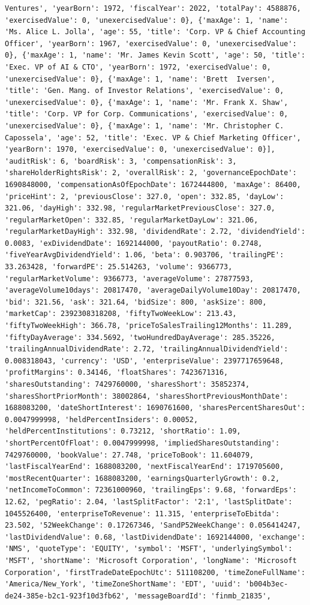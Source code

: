 \documentclass[
  letterpaper,
]{report}
\begin{document}
\begin{verbatim}
Ventures', 'yearBorn': 1972, 'fiscalYear': 2022, 'totalPay': 4588876, 'exercisedValue': 0, 'unexercisedValue': 0}, {'maxAge': 1, 'name': 'Ms. Alice L. Jolla', 'age': 55, 'title': 'Corp. VP & Chief Accounting Officer', 'yearBorn': 1967, 'exercisedValue': 0, 'unexercisedValue': 0}, {'maxAge': 1, 'name': 'Mr. James Kevin Scott', 'age': 50, 'title': 'Exec. VP of AI & CTO', 'yearBorn': 1972, 'exercisedValue': 0, 'unexercisedValue': 0}, {'maxAge': 1, 'name': 'Brett  Iversen', 'title': 'Gen. Mang. of Investor Relations', 'exercisedValue': 0, 'unexercisedValue': 0}, {'maxAge': 1, 'name': 'Mr. Frank X. Shaw', 'title': 'Corp. VP for Corp. Communications', 'exercisedValue': 0, 'unexercisedValue': 0}, {'maxAge': 1, 'name': 'Mr. Christopher C. Capossela', 'age': 52, 'title': 'Exec. VP & Chief Marketing Officer', 'yearBorn': 1970, 'exercisedValue': 0, 'unexercisedValue': 0}], 'auditRisk': 6, 'boardRisk': 3, 'compensationRisk': 3, 'shareHolderRightsRisk': 2, 'overallRisk': 2, 'governanceEpochDate': 1690848000, 'compensationAsOfEpochDate': 1672444800, 'maxAge': 86400, 'priceHint': 2, 'previousClose': 327.0, 'open': 332.85, 'dayLow': 321.06, 'dayHigh': 332.98, 'regularMarketPreviousClose': 327.0, 'regularMarketOpen': 332.85, 'regularMarketDayLow': 321.06, 'regularMarketDayHigh': 332.98, 'dividendRate': 2.72, 'dividendYield': 0.0083, 'exDividendDate': 1692144000, 'payoutRatio': 0.2748, 'fiveYearAvgDividendYield': 1.06, 'beta': 0.903706, 'trailingPE': 33.263428, 'forwardPE': 25.514263, 'volume': 9366773, 'regularMarketVolume': 9366773, 'averageVolume': 27877593, 'averageVolume10days': 20817470, 'averageDailyVolume10Day': 20817470, 'bid': 321.56, 'ask': 321.64, 'bidSize': 800, 'askSize': 800, 'marketCap': 2392308318208, 'fiftyTwoWeekLow': 213.43, 'fiftyTwoWeekHigh': 366.78, 'priceToSalesTrailing12Months': 11.289, 'fiftyDayAverage': 334.5692, 'twoHundredDayAverage': 285.35226, 'trailingAnnualDividendRate': 2.72, 'trailingAnnualDividendYield': 0.008318043, 'currency': 'USD', 'enterpriseValue': 2397717659648, 'profitMargins': 0.34146, 'floatShares': 7423671316, 'sharesOutstanding': 7429760000, 'sharesShort': 35852374, 'sharesShortPriorMonth': 38002864, 'sharesShortPreviousMonthDate': 1688083200, 'dateShortInterest': 1690761600, 'sharesPercentSharesOut': 0.0047999998, 'heldPercentInsiders': 0.00052, 'heldPercentInstitutions': 0.73212, 'shortRatio': 1.09, 'shortPercentOfFloat': 0.0047999998, 'impliedSharesOutstanding': 7429760000, 'bookValue': 27.748, 'priceToBook': 11.604079, 'lastFiscalYearEnd': 1688083200, 'nextFiscalYearEnd': 1719705600, 'mostRecentQuarter': 1688083200, 'earningsQuarterlyGrowth': 0.2, 'netIncomeToCommon': 72361000960, 'trailingEps': 9.68, 'forwardEps': 12.62, 'pegRatio': 2.04, 'lastSplitFactor': '2:1', 'lastSplitDate': 1045526400, 'enterpriseToRevenue': 11.315, 'enterpriseToEbitda': 23.502, '52WeekChange': 0.17267346, 'SandP52WeekChange': 0.056414247, 'lastDividendValue': 0.68, 'lastDividendDate': 1692144000, 'exchange': 'NMS', 'quoteType': 'EQUITY', 'symbol': 'MSFT', 'underlyingSymbol': 'MSFT', 'shortName': 'Microsoft Corporation', 'longName': 'Microsoft Corporation', 'firstTradeDateEpochUtc': 511108200, 'timeZoneFullName': 'America/New_York', 'timeZoneShortName': 'EDT', 'uuid': 'b004b3ec-de24-385e-b2c1-923f10d3fb62', 'messageBoardId': 'finmb_21835', 
\end{verbatim}
\end{document}
